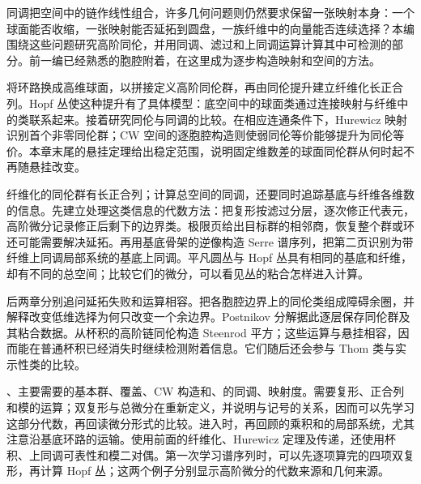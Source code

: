 
% 

\BookPartGuide
同调把空间中的链作线性组合，许多几何问题则仍然要求保留一张映射本身：一个球面能否收缩，一张映射能否延拓到圆盘，一族纤维中的向量能否连续选择？本编围绕这些问题研究高阶同伦，并用同调、滤过和上同调运算计算其中可检测的部分。前一编已经熟悉的胞腔附着，在这里成为逐步构造映射和空间的方法。

\ProseParagraphBreak

将环路换成高维球面，以拼接定义高阶同伦群，再由同伦提升建立纤维化长正合列。Hopf 丛使这种提升有了具体模型：底空间中的球面类通过连接映射与纤维中的类联系起来。接着研究同伦与同调的比较。在相应连通条件下，Hurewicz 映射识别首个非零同伦群；CW 空间的逐胞腔构造则使弱同伦等价能够提升为同伦等价。本章末尾的悬挂定理给出稳定范围，说明固定维数差的球面同伦群从何时起不再随悬挂改变。

\ProseParagraphBreak

纤维化的同伦群有长正合列；计算总空间的同调，还要同时追踪基底与纤维各维数的信息。先建立处理这类信息的代数方法：把复形按滤过分层，逐次修正代表元，高阶微分记录修正后剩下的边界类。极限页给出目标群的相邻商，恢复整个群或环还可能需要解决延拓。再用基底骨架的逆像构造 Serre 谱序列，把第二页识别为带纤维上同调局部系统的基底上同调。平凡圆丛与 Hopf 丛具有相同的基底和纤维，却有不同的总空间；比较它们的微分，可以看见丛的粘合怎样进入计算。

\ProseParagraphBreak

后两章分别追问延拓失败和运算相容。把各胞腔边界上的同伦类组成障碍余圈，并解释改变低维选择为何只改变一个余边界。Postnikov 分解据此逐层保存同伦群及其粘合数据。从杯积的高阶链同伦构造 Steenrod 平方；这些运算与悬挂相容，因而能在普通杯积已经消失时继续检测附着信息。它们随后还会参与 Thom 类与实示性类的比较。

\ProseParagraphBreak

、主要需要的基本群、覆盖、CW 构造和、的同调、映射度。需要复形、正合列和模的运算；双复形与总微分在重新定义，并说明与记号的关系，因而可以先学习这部分代数，再回读微分形式的比较。进入时，再回顾的乘积和的局部系统，尤其注意沿基底环路的运输。使用前面的纤维化、Hurewicz 定理及传递，还使用杯积、上同调可表性和模二对偶。第一次学习谱序列时，可以先逐项算完的四项双复形，再计算 Hopf 丛；这两个例子分别显示高阶微分的代数来源和几何来源。







